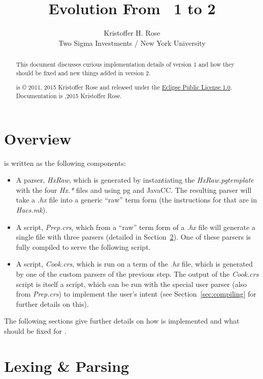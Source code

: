 \documentclass[11pt]{article} %
\title{
  Evolution From \HAX\ 1 to 2
}
\author{
  Kristoffer H. Rose\\
  Two Sigma Investments / New York University
}
\newcommand{\basecopyright}{\noindent
  \HAX is © 2011, 2015 Kristoffer Rose and released under the
  \href{https://www.eclipse.org/legal/epl-v10.html}{Eclipse Public License 1.0}.\\
  \noindent Documentation is \doclicenseImage[imagewidth=3em]
  2011,2015 Kristoffer Rose.}
\newcommand{\documentcopyright}{\basecopyright}
\begin{document}
\maketitle

\begin{abstract}\noindent
  This document discusses curious implementation details of \HAX version 1 and how they should be
  fixed and new things added in \HAX version 2.

  \compacttableofcontents

  \vspace*{2em}\small\color{gray}\noindent%
  \documentcopyright
\end{abstract}


\section{Overview}\label{sec:overview}

 is written as the following components:
\begin{itemize}

\item A parser, \emph{HxRaw}, which is generated by instantiating the \emph{HxRaw.pgtemplate} with
  the four \emph{Hx.*} files and using pg and JavaCC. The resulting parser will take a \emph{.hx}
  file into a generic ``raw''  term form (the instructions for that are in \emph{Hacs.mk}).

\item A  script, \emph{Prep.crs}, which from a ``raw''  term form of a \emph{.hx} file
  will generate a single file with three parsers (detailed in Section~\ref{sec:parsing}). One of
  these parsers is fully compiled to serve the following script.

\item A  script, \emph{Cook.crs}, which is run on a  term of the \emph{.hx} file, which
  is generated by one of the custom parsers of the previous step. The output of the \emph{Cook.crs}
  script is itself a  script, which can be run with the special user parser (also from
  \emph{Prep.crs}) to implement the user's intent (see Section~\ref{sec:compiling} for further
  details on this).

\end{itemize}
The following sections give further details on how  is implemented and what should be fixed for
.


\section{Lexing \& Parsing}\label{sec:parsing}
\end{document}
